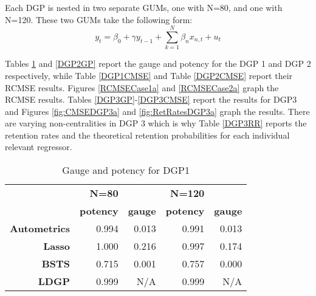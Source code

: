 \documentclass[11pt, oneside]{book}   	%
\begin{document}

Each DGP is nested in two separate GUMs, one with N=80, and one with N=120. These two GUMs take the following form:
$$y_{t}=\beta_{0} + \gamma y_{t-1}+\sum_{k=1}^{N}\beta_{n}x_{n,t} + u_{t}$$

Tables \ref{DGP1GP} and \ref{DGP2GP} report the gauge and potency for the DGP 1 and DGP 2 respectively, while Table \ref{DGP1CMSE} and Table \ref{DGP2CMSE} report their RCMSE results. Figures \ref{RCMSECase1a} and \ref{RCMSECase2a} graph the RCMSE results. Tables \ref{DGP3GP}-\ref{DGP3CMSE} report the results for DGP3 and Figures \ref{fig:CMSEDGP3a} and \ref{fig:RetRatesDGP3a} graph the results. There are varying non-centralities in DGP 3 which is why Table \ref{DGP3RR} reports the retention rates and the theoretical retention probabilities for each individual relevant regressor. 

\begin{table}[htbp]
  \centering
 
    \begin{tabular}{rrrrr}

          & \textbf{N=80} & \textbf{} & \textbf{N=120} & \textbf{} \\

          & \textbf{potency} & \textbf{gauge} & \textbf{potency} & \textbf{gauge} \\
    \textbf{Autometrics} & 0.994 & 0.013 & 0.991 & 0.013 \\
    \textbf{Lasso} & 1.000 & 0.216 & 0.997 & 0.174 \\
    \textbf{BSTS} & 0.715 & 0.001 & 0.757 & 0.000 \\
    \textbf{LDGP} & 0.999 & N/A   & 0.999 & N/A \\

    \end{tabular}%
 
  \caption{Gauge and potency for DGP1} 
   \label{DGP1GP}%
\end{table}%
\end{document}
